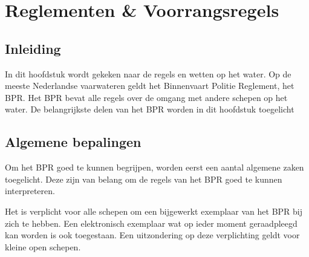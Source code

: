 \chapter{Reglementen \& Voorrangsregels}
\section{Inleiding}
In dit hoofdstuk wordt gekeken naar de regels en wetten op het water. Op de meeste Nederlandse vaarwateren geldt het Binnenvaart Politie Reglement, het BPR. Het BPR bevat alle regels over de omgang met andere schepen op het water. De belangrijkste delen van het BPR worden in dit hoofdstuk toegelicht

\section{Algemene bepalingen}
Om het BPR goed te kunnen begrijpen, worden eerst een aantal algemene zaken toegelicht. Deze zijn van belang om de regels van het BPR goed te kunnen interpreteren.

Het is verplicht voor alle schepen om een bijgewerkt exemplaar van het BPR bij zich te hebben. Een elektronisch exemplaar wat op ieder moment geraadpleegd kan worden is ook toegestaan. Een uitzondering op deze verplichting geldt voor kleine open schepen. 

